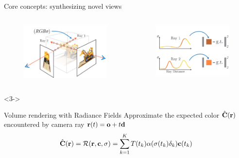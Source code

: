 \documentclass[aspectratio=1610]{beamer}
\begin{document}
\begin{frame}{Core concepts: synthesizing novel views}
    \begin{columns}
        \begin{column}{.5\textwidth}
            \begin{figure}[H]
                \includegraphics[width=.7\textwidth,keepaspectratio]{density-1}
            \end{figure}
        \end{column}
        \pause
        \begin{column}{.5\textwidth}
            \begin{figure}[H]
                \includegraphics[width=.7\textwidth,keepaspectratio]{density-2}
            \end{figure}
        \end{column}
    \end{columns}
    \begin{onlyenv}<3->
        \begin{block}{Volume rendering with Radiance Fields} 
            Approximate the expected color \(\hat{\vb{C}}(\vb{r})\) encountered by camera ray \(\vb{r}(t) = \vb{o} + t\vb{d}\)
            \begin{equation*}
                \hat{\vb{C}}(\vb{r}) = \mathcal{R}(\vb{r}, \vb{c}, \sigma) = \sum_{k = 1}^{K} T(t_k) \alpha (\sigma (t_k)\delta_k) \vb{c}(t_k)
            \end{equation*}
        \end{block}
    \end{onlyenv}
\end{frame}
\end{document}
